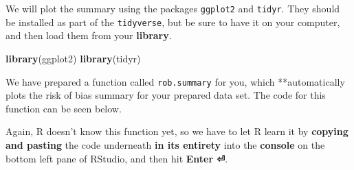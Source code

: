\documentclass[]{book}
\newenvironment{Shaded}{\begin{snugshade}}{\end{snugshade}}
\newcommand{\KeywordTok}[1]{\textcolor[rgb]{0.13,0.29,0.53}{\textbf{#1}}}
\newcommand{\NormalTok}[1]{#1}
\begin{document}
We will plot the summary using the packages \texttt{ggplot2} and \texttt{tidyr}. They should be installed as part of the \texttt{tidyverse}, but be sure to have it on your computer, and then load them from your \textbf{library}.

\begin{Shaded}
\begin{Highlighting}[]
\KeywordTok{library}\NormalTok{(ggplot2)}
\KeywordTok{library}\NormalTok{(tidyr)}
\end{Highlighting}
\end{Shaded}

We have prepared a function called \texttt{rob.summary} for you, which **automatically plots the risk of bias summary for your prepared data set. The code for this function can be seen below.

Again, R doesn't know this function yet, so we have to let R learn it by \textbf{copying and pasting} the code underneath \textbf{in its entirety} into the \textbf{console} on the bottom left pane of RStudio, and then hit \textbf{Enter ⏎}.
\end{document}
